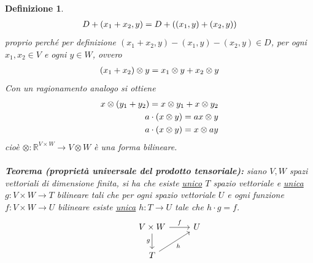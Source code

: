 \documentclass[oneside, 11pt]{amsbook}
\newcommand{\0}{{(0)}}
\newcommand{\3}{{(3)}}
\theoremstyle{colonplain}
\theoremstyle{colondefinition}
\newtheorem{defn}[thm]{Definizione}
\theoremstyle{colonremark}
\numberwithin{equation}{chapter}
\begin{document}
\begin{defn}
\begin{align}
    D + (x_1 + x_2, y) = D + ((x_1, y) + (x_2, y)) \notag
\end{align}
proprio perché per definizione $(x_1 + x_2, y) - (x_1, y) - (x_2, y) \in D$, per ogni $x_1, x_2 \in V$ e ogni $y \in W$, ovvero
\begin{align}
    (x_1 + x_2) \otimes y = x_1 \otimes y + x_2 \otimes y \notag
\end{align}
Con un ragionamento analogo si ottiene
\begin{align}
    x \otimes (y_1 + y_2) = x \otimes y_1 + x \otimes y_2 \notag \\
    a \cdot (x \otimes y) = ax \otimes y \notag \\
    a \cdot (x \otimes y) = x \otimes ay \notag
\end{align}
cioè $\otimes : \mathbb{R}^{V \times W} \longrightarrow V \otimes W$ è una forma bilineare. \\ \\
\textbf{Teorema (proprietà universale del prodotto tensoriale):} siano $V, W$ spazi vettoriali di dimensione finita, si ha che esiste \underline{unico} $T$ spazio vettoriale e \underline{unica} $g : V \times W \longrightarrow T$ bilineare tali che per ogni spazio vettoriale $U$ e ogni funzione $f : V \times W \longrightarrow U$ bilineare esiste \underline{unica} $h : T \longrightarrow U$ tale che $h \cdot g = f$. \\
\[
\begin{tikzcd}
&V \times W \arrow[r,"f"] \arrow[d,"g", swap] & U \\
&T \arrow[ur, "h", swap] 
\end{tikzcd}
\]



\end{defn}
\end{document}
